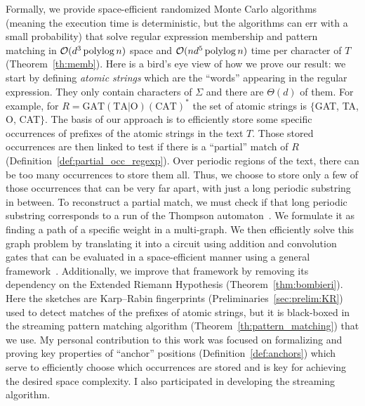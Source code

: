 Formally, we provide space-efficient randomized Monte Carlo algorithms (meaning the execution time is deterministic, but the algorithms can err with a small probability) that solve regular expression membership and pattern matching in $\mathcal{O}(d^3\operatorname{polylog} n)$ space and $\mathcal{O}(nd^5\operatorname{polylog} n)$ time per character of $T$ (Theorem~\ref{th:memb}).
%
Here is a bird's eye view of how we prove our result: we start by defining \emph{atomic strings} which are the ``words'' appearing in the regular expression. They only contain characters of $\Sigma$ and there are $\Theta(d)$ of them. For example, for $R= \mathrm{GAT}(\mathrm{TA} | \mathrm{O})(\mathrm{CAT})^*$  the set of atomic strings is $\{$GAT, TA, O, CAT$\}$.
%
The basis of our approach is to efficiently store some specific occurrences of prefixes of the atomic strings in the text $T$. Those stored occurrences are then linked to test if there is a “partial” match of $R$ (Definition~\ref*{def:partial_occ_regexp}).
Over periodic regions of the text, there can be too many occurrences to store them all.
Thus, we choose to store only a few of those occurrences that can be very far apart, with just a long periodic substring in between. To reconstruct a partial match, we must check if that long periodic substring corresponds to a run of the Thompson automaton~\cite{Thompson_automaton}. We formulate it as finding a path of a specific weight in a multi-graph. We then efficiently solve this graph problem by translating it into a circuit using addition and convolution gates that can be evaluated in a space-efficient manner using a general framework~\cite{LokshtanovN10,Bringmann17}. Additionally, we improve that framework by removing its dependency on the Extended Riemann Hypothesis (Theorem~\ref{thm:bombieri}). 
Here the sketches are Karp--Rabin fingerprints (Preliminaries~\ref{sec:prelim:KR}) used to detect matches of the prefixes of atomic strings, but it is black-boxed in the streaming pattern matching algorithm (Theorem~\ref{th:pattern_matching}) that we use.
My personal contribution to this work was focused on formalizing and proving key properties of ``anchor'' positions (Definition~\ref{def:anchors}) which serve to efficiently choose which occurrences are stored and is key for achieving the desired space complexity. I also participated in developing the streaming algorithm. %



